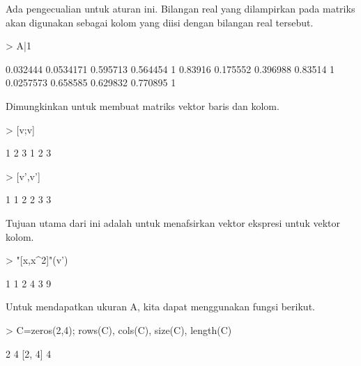 \documentclass[a4paper,10pt]{article}
\begin{document}
\begin{eulernotebook}
\begin{eulercomment}
\begin{eulercomment}
\begin{eulercomment}
\begin{eulercomment}
\begin{eulercomment}
\begin{eulercomment}
\begin{eulercomment}
Ada pengecualian untuk aturan ini. Bilangan real yang dilampirkan pada
matriks akan digunakan sebagai kolom yang diisi dengan bilangan real
tersebut.
\end{eulercomment}
\begin{eulerprompt}
>  A|1
\end{eulerprompt}
\begin{euleroutput}
       0.032444     0.0534171      0.595713      0.564454             1 
        0.83916      0.175552      0.396988       0.83514             1 
      0.0257573      0.658585      0.629832      0.770895             1 
\end{euleroutput}
\begin{eulercomment}
Dimungkinkan untuk membuat matriks vektor baris dan kolom.
\end{eulercomment}
\begin{eulerprompt}
> [v;v]
\end{eulerprompt}
\begin{euleroutput}
              1             2             3 
              1             2             3 
\end{euleroutput}
\begin{eulerprompt}
> [v',v']
\end{eulerprompt}
\begin{euleroutput}
              1             1 
              2             2 
              3             3 
\end{euleroutput}
\begin{eulercomment}
Tujuan utama dari ini adalah untuk menafsirkan vektor ekspresi untuk
vektor kolom.
\end{eulercomment}
\begin{eulerprompt}
> "[x,x^2]"(v')
\end{eulerprompt}
\begin{euleroutput}
              1             1 
              2             4 
              3             9 
\end{euleroutput}
\begin{eulercomment}
Untuk mendapatkan ukuran A, kita dapat menggunakan fungsi berikut.
\end{eulercomment}
\begin{eulerprompt}
> C=zeros(2,4); rows(C), cols(C), size(C), length(C)
\end{eulerprompt}
\begin{euleroutput}
  2
  4
  [2,  4]
  4
\end{euleroutput}
\begin{eulercomment}

\end{eulercomment}
\end{eulercomment}
\end{eulercomment}
\end{eulercomment}
\end{eulercomment}
\end{eulercomment}
\end{eulercomment}
\end{eulernotebook}
\end{document}
